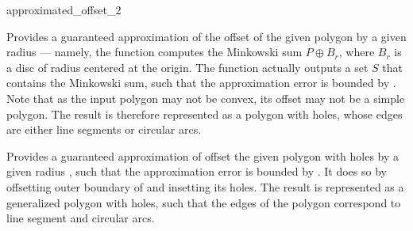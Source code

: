 
\ccRefPageBegin

\begin{ccRefFunction}{approximated_offset_2}


   {Provides a guaranteed approximation of the offset of the given polygon
     by a given radius  --- namely, the function computes the
    Minkowski sum $P \oplus B_r$, where $B_r$ is a disc of radius
     centered at the origin.
    The function actually outputs a set $S$ that contains the Minkowski sum,
    such that the approximation error is bounded by .
    Note that as the input polygon may not be convex, its offset may not be a
    simple polygon. The result is therefore represented as a polygon with
    holes, whose edges are either line segments or circular arcs.
    }

   {Provides a guaranteed approximation of offset the given polygon with holes
     by a given radius , such that the approximation error is bounded
    by . It does so by offsetting outer boundary of  and insetting
    its holes.
    The result is represented as a generalized polygon with holes, such that the edges
    of the polygon correspond to line segment and circular arcs.
    }



\end{ccRefFunction}

